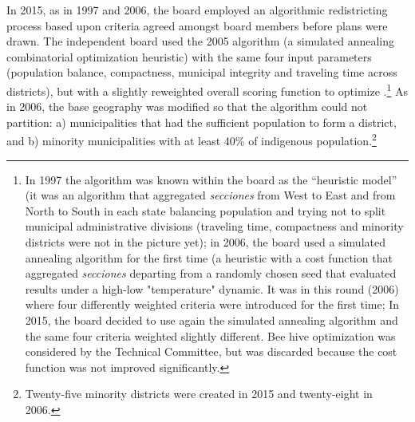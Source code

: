 \documentclass[letter,12pt]{article}
\begin{document}
In 2015, as in 1997 and 2006, the board employed an algorithmic redistricting process based upon criteria agreed amongst board members before plans were drawn. The independent board used the 2005 algorithm (a simulated annealing combinatorial optimization heuristic) with the same four input parameters (population balance, compactness, municipal integrity and traveling time across districts), but with a slightly reweighted overall scoring function to optimize \citep{trelles.mtz.tesisItam.2007,acuerdoife2013}.\footnote{In 1997 the algorithm was known within the board as the ``heuristic model'' (it was an algorithm that aggregated \emph{secciones} from West to East and from North to South in each state balancing population and trying not to split municipal administrative divisions (traveling time, compactness and minority districts were not in the picture yet); in 2006, the board used a simulated annealing algorithm for the first time (a heuristic with a cost function that aggregated \emph{secciones} departing from a randomly chosen seed that evaluated results under a high-low "temperature" dynamic. It was in this round (2006) where four differently weighted criteria  were introduced for the first time; In 2015, the board decided to use again the simulated annealing algorithm and the same four criteria weighted slightly different. Bee hive optimization was considered by the Technical Committee, but was discarded because the cost function was not improved significantly.} As in 2006, the base geography was modified so that the algorithm could not partition: a) municipalities that had the sufficient population to form a district, and b) minority municipalities with at least 40\% of indigenous population.\footnote{Twenty-five minority districts were created in 2015 and twenty-eight in 2006.}
\end{document}
